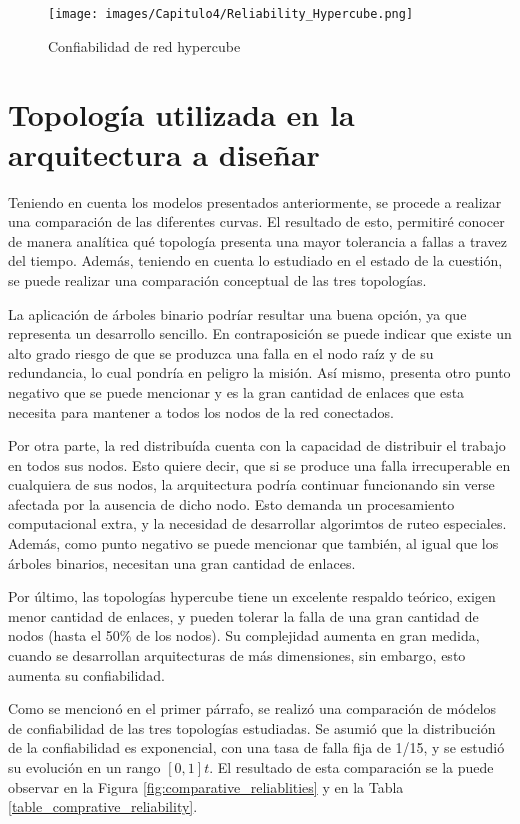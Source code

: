 \begin{figure}[H]
 \centering
 \texttt{[image: images/Capitulo4/Reliability\_Hypercube.png]}
  \caption{Confiabilidad de red hypercube}
\label{fig:Reliability_Hypercube}
\end{figure}

\section{Topología utilizada en la arquitectura a diseñar}

Teniendo en cuenta los modelos presentados anteriormente, se procede a realizar una comparación de las diferentes curvas. El resultado de esto, permitiré conocer de manera analítica qué topología presenta una mayor tolerancia a fallas a travez del tiempo. Además, teniendo en cuenta lo estudiado en el estado de la cuestión, se puede realizar una comparación conceptual de las tres topologías.

La aplicación de árboles binario podríar resultar una buena opción, ya que representa un desarrollo sencillo. En contraposición se puede indicar que existe un alto grado riesgo de que se produzca una falla en el nodo raíz y de su redundancia, lo cual pondría en peligro la misión. Así mismo, presenta otro punto negativo que se puede mencionar y es la gran cantidad de enlaces que esta necesita para mantener a todos los nodos de la red conectados.

Por otra parte, la red distribuída cuenta con la capacidad de distribuir el trabajo en todos sus nodos. Esto quiere decir, que si se produce una falla irrecuperable en cualquiera de sus nodos, la arquitectura podría continuar funcionando sin verse afectada por la ausencia de dicho nodo. Esto demanda un procesamiento computacional extra, y la necesidad de desarrollar algorimtos de ruteo especiales. Además, como punto negativo se puede mencionar que también, al igual que los árboles binarios, necesitan una gran cantidad de enlaces.

Por último, las topologías hypercube tiene un excelente respaldo teórico, exigen menor cantidad de enlaces, y pueden tolerar la falla de una gran cantidad de nodos (hasta el 50\% de los nodos). Su complejidad aumenta en gran medida, cuando se desarrollan arquitecturas de más dimensiones, sin embargo, esto aumenta su confiabilidad.

Como se mencionó en el primer párrafo, se realizó una comparación de módelos de confiabilidad de las tres topologías estudiadas. Se asumió que la distribución de la confiabilidad es exponencial, con una tasa de falla fija de 1/15, y se estudió su evolución en un rango $[0,1]t$. El resultado de esta comparación se la puede observar en la Figura \ref{fig:comparative_reliablities} y en la Tabla \ref{table_comprative_reliability}.

